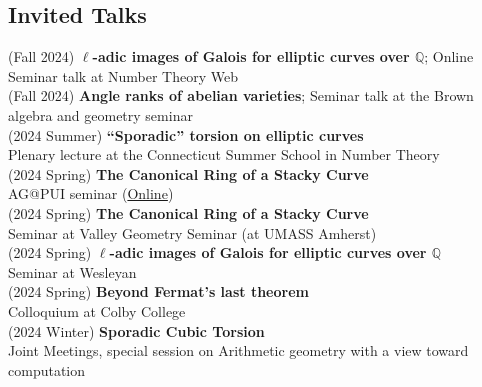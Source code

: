 \documentclass[margin,line]{res}
\begin{document}
\begin{resume}
  \section{\sc Invited Talks}
(Fall 2024) \textbf{$\ell$-adic images of Galois for elliptic curves over $\mathbb{Q}$};
Online Seminar talk at Number Theory Web
\vspace{.05cm}\\  
(Fall 2024) \textbf{Angle ranks of abelian varieties};
Seminar talk at the Brown algebra and geometry seminar
\vspace{.05cm}\\
  (2024 Summer) \textbf{“Sporadic” torsion on elliptic curves}\\
Plenary lecture at the Connecticut Summer School in Number Theory
\vspace{.05cm}\\    
(2024 Spring) \textbf{The Canonical Ring of a Stacky Curve}\\
AG@PUI seminar (\href{https://sites.google.com/fordham.edu/agatpui/home}{Online})
\vspace{.05cm}\\    
(2024 Spring) \textbf{The Canonical Ring of a Stacky Curve}\\
Seminar at Valley Geometry Seminar (at UMASS Amherst)
\vspace{.05cm}\\  
(2024 Spring) \textbf{$\ell$-adic images of Galois for elliptic curves over $\mathbb{Q}$}\\
Seminar at Wesleyan
\vspace{.05cm}\\  
(2024 Spring) \textbf{Beyond Fermat's last theorem}\\
Colloquium at Colby College
\vspace{.05cm}\\  
(2024 Winter) \textbf{Sporadic Cubic Torsion}\\
Joint Meetings, special session on Arithmetic geometry with a view toward computation
\vspace{.05cm}\\  

\end{resume}
\end{document}
